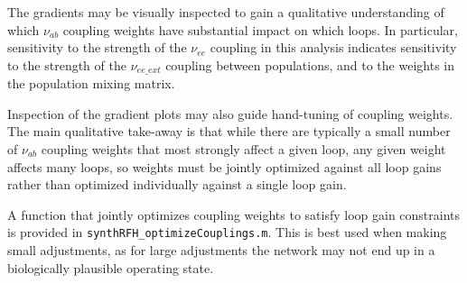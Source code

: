 The gradients may be visually inspected to gain a qualitative understanding
of which $\nu_{ab}$ coupling weights have substantial impact on which loops.
In particular, sensitivity to the strength of the $\nu_{ee}$ coupling in this
analysis indicates sensitivity to the strength of the $\nu_{ee\_ext}$
coupling between populations, and to the weights in the population mixing
matrix.

Inspection of the gradient plots may also guide hand-tuning of coupling
weights. The main qualitative take-away is that while there are typically
a small number of $\nu_{ab}$ coupling weights that most strongly affect a
given loop, any given weight affects many loops, so weights must be jointly
optimized against all loop gains rather than optimized individually against
a single loop gain.

A function that jointly optimizes coupling weights to satisfy loop gain
constraints is provided in \texttt{synthRFH\_optimizeCouplings.m}. This is
best used when making small adjustments, as for large adjustments the
network may not end up in a biologically plausible operating state.

%
%
